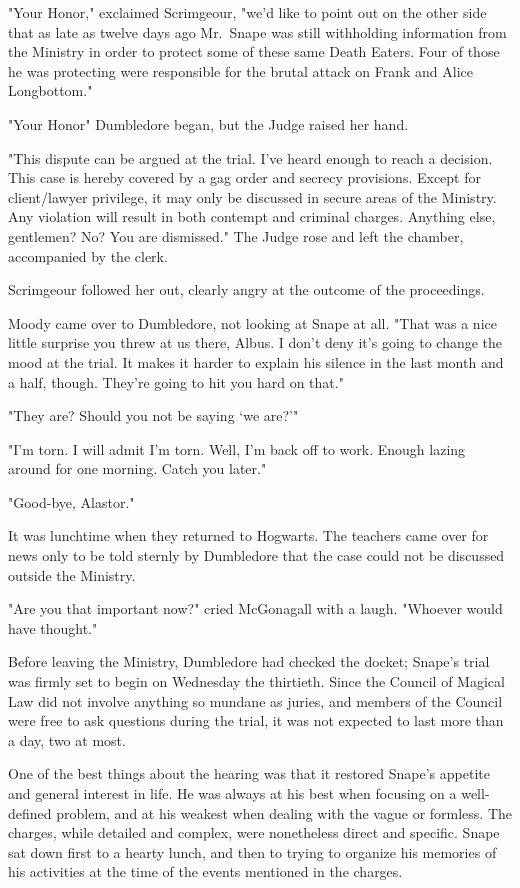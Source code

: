 "Your Honor," exclaimed Scrimgeour, "we'd like to point out on the other side that as late as twelve days ago Mr.~Snape was still withholding information from the Ministry in order to protect some of these same Death Eaters. Four of those he was protecting were responsible for the brutal attack on Frank and Alice Longbottom."

"Your Honor{\el}" Dumbledore began, but the Judge raised her hand.

"This dispute can be argued at the trial. I've heard enough to reach a decision. This case is hereby covered by a gag order and secrecy provisions. Except for client\slash lawyer privilege, it may only be discussed in secure areas of the Ministry. Any violation will result in both contempt and criminal charges. Anything else, gentlemen? No? You are dismissed." The Judge rose and left the chamber, accompanied by the clerk.

Scrimgeour followed her out, clearly angry at the outcome of the proceedings.

Moody came over to Dumbledore, not looking at Snape at all. "That was a nice little surprise you threw at us there, Albus. I don't deny it's going to change the mood at the trial. It makes it harder to explain his silence in the last month and a half, though. They're going to hit you hard on that."

"They are? Should you not be saying `we are?'"

"I'm torn. I will admit I'm torn. Well, I'm back off to work. Enough lazing around for one morning. Catch you later."

"Good-bye, Alastor."

It was lunchtime when they returned to Hogwarts. The teachers came over for news only to be told sternly by Dumbledore that the case could not be discussed outside the Ministry.

"Are you that important now?" cried McGonagall with a laugh. "Whoever would have thought."

Before leaving the Ministry, Dumbledore had checked the docket; Snape's trial was firmly set to begin on Wednesday the thirtieth. Since the Council of Magical Law did not involve anything so mundane as juries, and members of the Council were free to ask questions during the trial, it was not expected to last more than a day, two at most.

One of the best things about the hearing was that it restored Snape's appetite and general interest in life. He was always at his best when focusing on a well-defined problem, and at his weakest when dealing with the vague or formless. The charges, while detailed and complex, were nonetheless direct and specific. Snape sat down first to a hearty lunch, and then to trying to organize his memories of his activities at the time of the events mentioned in the charges.

